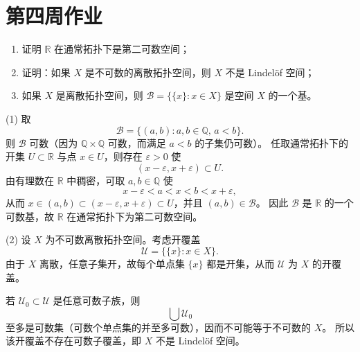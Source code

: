 \section{第四周作业}
\begin{homework}[(4)]
\begin{enumerate}
  \item 证明 $\mathbb{R}$ 在通常拓扑下是第二可数空间；
  \item 证明：如果 $X$ 是不可数的离散拓扑空间，则 $X$ 不是 Lindel\"of 空间；
  \item 如果 $X$ 是离散拓扑空间，则 $\mathcal{B}=\{\{x\}:x\in X\}$ 是空间 $X$ 的一个基。
\end{enumerate}
\end{homework}

\begin{solution}
(1)\;
取
\[
\mathcal{B}=\{(a,b):a,b\in\mathbb{Q},\,a<b\}.
\]
则 $\mathcal{B}$ 可数（因为 $\mathbb{Q}\times\mathbb{Q}$ 可数，而满足 $a<b$ 的子集仍可数）。
任取通常拓扑下的开集 $U\subset\mathbb{R}$ 与点 $x\in U$，则存在 $\varepsilon>0$ 使
\[
(x-\varepsilon,x+\varepsilon)\subset U.
\]
由有理数在 $\mathbb{R}$ 中稠密，可取 $a,b\in\mathbb{Q}$ 使
\[
x-\varepsilon<a<x<b<x+\varepsilon,
\]
从而 $x\in(a,b)\subset(x-\varepsilon,x+\varepsilon)\subset U$，并且 $(a,b)\in\mathcal{B}$。
因此 $\mathcal{B}$ 是 $\mathbb{R}$ 的一个可数基，故 $\mathbb{R}$ 在通常拓扑下为第二可数空间。
\end{solution}

\begin{solution}
(2)\;
设 $X$ 为不可数离散拓扑空间。考虑开覆盖
\[
\mathcal{U}=\bigl\{\{x\}:x\in X\bigr\}.
\]
由于 $X$ 离散，任意子集开，故每个单点集 $\{x\}$ 都是开集，从而 $\mathcal{U}$ 为 $X$ 的开覆盖。

若 $\mathcal{U}_0\subset\mathcal{U}$ 是任意可数子族，则
\[
\bigcup \mathcal{U}_0
\]
至多是可数集（可数个单点集的并至多可数），因而不可能等于不可数的 $X$。
所以该开覆盖不存在可数子覆盖，即 $X$ 不是 Lindel\"of 空间。
\end{solution}

